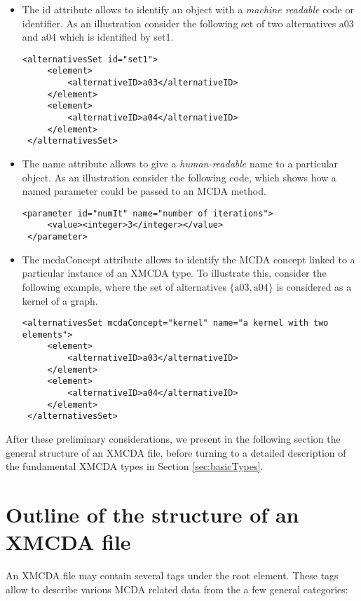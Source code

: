 \documentclass[a4paper,oneside,10 pt]{article}
\newcommand{\XMCDA}{{\asciifamily XMCDA}\xspace}
\newcommand{\MCDA}{MCDA\xspace}
\newcommand{\code}{\asciifamily}
\begin{document}
\begin{itemize}
 \item The {\code id} attribute allows to identify an object with a {\em machine readable} code or identifier. As an illustration consider the following set of two alternatives {\code a03} and {\code a04} which is identified by {\code set1}. 
{\code
\begin{lstlisting}[style=prototype]
 <alternativesSet id="set1">
	 <element>
		 <alternativeID>a03</alternativeID>
	 </element>
	 <element>
		 <alternativeID>a04</alternativeID>
	 </element>
 </alternativesSet>
\end{lstlisting}
}
 \item The {\code name} attribute allows to give a \textit{human-readable} name to a particular object. As an illustration consider the following code, which shows how a named parameter could be passed to an \MCDA method.
{\code
\begin{lstlisting}[style=prototype]
<parameter id="numIt" name="number of iterations">
	 <value><integer>3</integer></value>
 </parameter>
\end{lstlisting}
}
 \item The {\code mcdaConcept} attribute allows to identify the \MCDA concept linked to a particular instance of an \XMCDA type. To illustrate this, consider the following example, where the set of alternatives $\{\mbox{a03}, \mbox{a04}\}$ is considered as a kernel of a graph.
{\code
\begin{lstlisting}[style=prototype]
 <alternativesSet mcdaConcept="kernel" name="a kernel with two elements">
	 <element>
		 <alternativeID>a03</alternativeID>
	 </element>
	 <element>
		 <alternativeID>a04</alternativeID>
	 </element>
 </alternativesSet>
\end{lstlisting}
}
\end{itemize}

After these preliminary considerations, we present in the following section the general structure of an \XMCDA file, before turning to a detailed description of the fundamental \XMCDA types in Section \ref{sec:basicTypes}. 

\section{Outline of the structure of an \XMCDA file}\label{sec:generalStructure}

An \XMCDA file may contain several tags under the root element. These tags allow to describe various \MCDA related data from the a few general categories:
\end{document}
